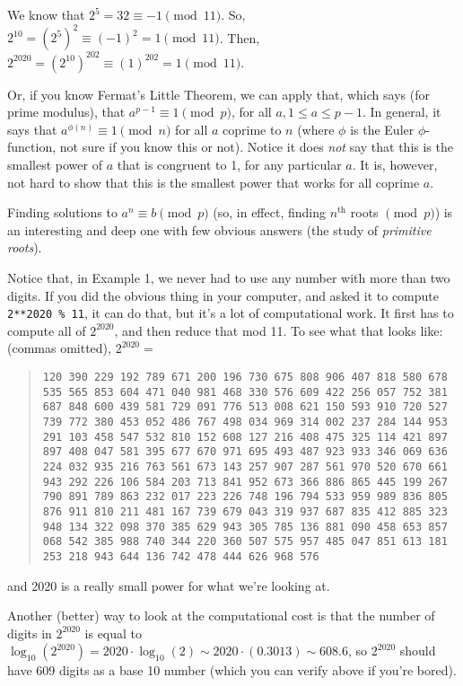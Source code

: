 \documentclass[12pt]{article}
\begin{document}
We know that $2^5 = 32 \equiv -1 \pmod{11}$.  So, $2^{10} = \left(2^5\right)^2 \equiv (-1)^2 = 1 \pmod{11}$.  Then, $2^{2020} = \left(2^{10}\right)^{202} \equiv (1)^{202} = 1 \pmod{11}$.

Or, if you know Fermat's Little Theorem, we can apply that, which says (for prime modulus), that $a^{p-1} \equiv 1 \pmod{p}$, for all $a, 1 \leq a \leq p-1$.  In general, it says that $a^{\phi(n)} \equiv 1 \pmod{n}$ for all $a$ coprime to $n$ (where $\phi$ is the Euler $\phi$-function, not sure if you know this or not).  Notice it does \emph{not} say that this is the smallest power of $a$ that is congruent to 1, for any particular $a$.  It is, however, not hard to show that this is the smallest power that works for all coprime $a$.

Finding solutions to $a^n \equiv b \pmod{p}$ (so, in effect, finding $n^{\text{th}}$ roots $\pmod{p}$) is an interesting and deep one with few obvious answers (the study of \emph{primitive roots}).

Notice that, in Example 1, we never had to use any number with more than two digits.  If you did the obvious thing in your computer, and asked it to compute \texttt{2**2020 \% 11}, it can do that, but it's a lot of computational work.  It first has to compute all of $2^{2020}$, and then reduce that mod 11.  To see what that looks like: (commas omitted), $2^{2020} =$ 

\begin{quote} 
\texttt{120 390 229 192 789 671 200 196 730 675 808 906 407 818 580 678 535 565 853 604 471 040 981 468 330 576 609 422 256 057 752 381 687 848 600 439 581 729 091 776 513 008 621 150 593 910 720 527 739 772 380 453 052 486 767 498 034 969 314 002 237 284 144 953 291 103 458 547 532 810 152 608 127 216 408 475 325 114 421 897 897 408 047 581 395 677 670 971 695 493 487 923 933 346 069 636 224 032 935 216 763 561 673 143 257 907 287 561 970 520 670 661 943 292 226 106 584 203 713 841 952 673 366 886 865 445 199 267 790 891 789 863 232 017 223 226 748 196 794 533 959 989 836 805 876 911 810 211 481 167 739 679 043 319 937 687 835 412 885 323 948 134 322 098 370 385 629 943 305 785 136 881 090 458 653 857 068 542 385 988 740 344 220 360 507 575 957 485 047 851 613 181 253 218 943 644 136 742 478 444 626 968 576
} \end{quote}

and 2020 is a really small power for what we're looking at.

Another (better) way to look at the computational cost is that the number of digits in $2^{2020}$ is equal to $\log_{10}(2^{2020}) = 2020 \cdot \log_{10}(2) \sim 2020 \cdot (0.3013) \sim 608.6$, so $2^{2020}$ should have 609 digits as a base 10 number (which you can verify above if you're bored).
\end{document}
